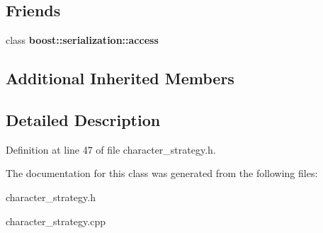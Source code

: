 \subsection*{Friends}
\begin{DoxyCompactItemize}
\item 
\hypertarget{class_human_player_strategy_ac98d07dd8f7b70e16ccb9a01abf56b9c}{}\label{class_human_player_strategy_ac98d07dd8f7b70e16ccb9a01abf56b9c} 
class {\bfseries boost\+::serialization\+::access}
\end{DoxyCompactItemize}
\subsection*{Additional Inherited Members}


\subsection{Detailed Description}


Definition at line 47 of file character\+\_\+strategy.\+h.



The documentation for this class was generated from the following files\+:\begin{DoxyCompactItemize}
\item 
character\+\_\+strategy.\+h\item 
character\+\_\+strategy.\+cpp\end{DoxyCompactItemize}
